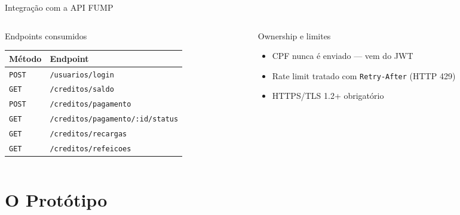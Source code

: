 \documentclass[10pt, aspectratio=169]{beamer}
\begin{document}
\begin{frame}{Integração com a API FUMP}
    \begin{columns}[T]
        \begin{column}{0.58\textwidth}
            \begin{block}{Endpoints consumidos}
                \small
                \begin{tabular}{@{}ll@{}}
                    \toprule
                    \textbf{Método} & \textbf{Endpoint} \\
                    \midrule
                    \texttt{POST} & \texttt{/usuarios/login} \\
                    \texttt{GET}  & \texttt{/creditos/saldo} \\
                    \texttt{POST} & \texttt{/creditos/pagamento} \\
                    \texttt{GET}  & \texttt{/creditos/pagamento/:id/status} \\
                    \texttt{GET}  & \texttt{/creditos/recargas} \\
                    \texttt{GET}  & \texttt{/creditos/refeicoes} \\
                    \bottomrule
                \end{tabular}
            \end{block}
        \end{column}
        \begin{column}{0.38\textwidth}
            \begin{exampleblock}{Ownership e limites}
                \small
                \begin{itemize}
                    \item CPF nunca é enviado --- vem do JWT
                    \item Rate limit tratado com \texttt{Retry-After} (HTTP 429)
                    \item HTTPS/TLS 1.2+ obrigatório
                \end{itemize}
            \end{exampleblock}
        \end{column}
    \end{columns}
\end{frame}

\section{O Protótipo}
\end{document}
